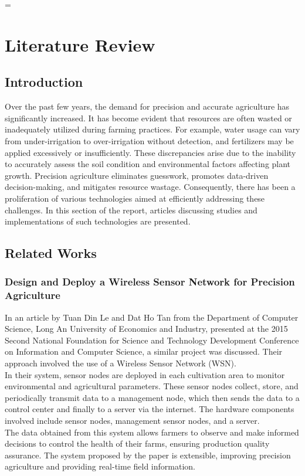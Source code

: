 =\documentclass[12pt, a4paper]{article}
\begin{document}
\section{Literature Review}
\subsection{Introduction}
Over the past few years, the demand for precision and accurate agriculture has significantly increased. It has become evident that resources are often wasted or inadequately utilized during farming practices. For example, water usage can vary from under-irrigation to over-irrigation without detection, and fertilizers may be applied excessively or insufficiently. These discrepancies arise due to the inability to accurately assess the soil condition and environmental factors affecting plant growth. Precision agriculture eliminates guesswork, promotes data-driven decision-making, and mitigates resource wastage. Consequently, there has been a proliferation of various technologies aimed at efficiently addressing these challenges. In this section of the report, articles discussing studies and implementations of such technologies are presented.

\subsection{Related Works}
\subsubsection{Design and Deploy a Wireless Sensor Network for Precision Agriculture}
In an article by Tuan Din Le and Dat Ho Tan \cite{7302210} from the Department of Computer Science, Long An University of Economics and Industry, presented at the 2015 Second National Foundation for Science and Technology Development Conference on Information and Computer Science, a similar project was discussed. Their approach involved the use of a Wireless Sensor Network (WSN).\\
In their system, sensor nodes are deployed in each cultivation area to monitor environmental and agricultural parameters. These sensor nodes collect, store, and periodically transmit data to a management node, which then sends the data to a control center and finally to a server via the internet. The hardware components involved include sensor nodes, management sensor nodes, and a server.\\
The data obtained from this system allows farmers to observe and make informed decisions to control the health of their farms, ensuring production quality assurance. The system proposed by the paper is extensible, improving precision agriculture and providing real-time field information.
\end{document}
